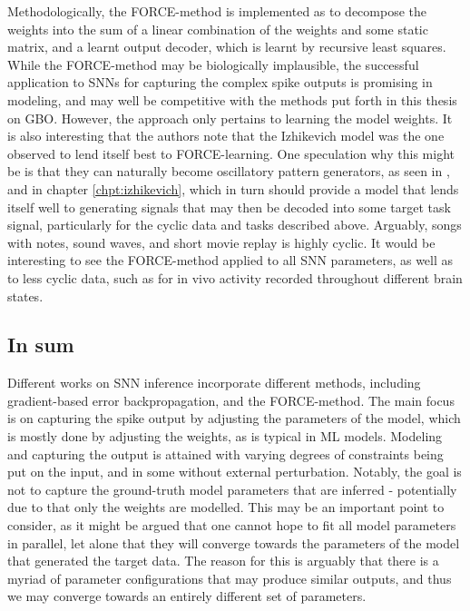 \documentclass[mphil,deptreport,ianc]{infthesis} %
\begin{document}
Methodologically, the FORCE-method is implemented as to decompose the weights into the sum of a linear combination of the weights and some static matrix, and a learnt output decoder, which is learnt by recursive least squares.
While the FORCE-method may be biologically implausible, the successful application to SNNs for capturing the complex spike outputs is promising in modeling, and may well be competitive with the methods put forth in this thesis on GBO.
However, the approach only pertains to learning the model weights.
It is also interesting that the authors note that the Izhikevich model was the one observed to lend itself best to FORCE-learning.
One speculation why this might be is that they can naturally become oscillatory pattern generators, as seen in \cite{Oliveira2019}, and in chapter \ref{chpt:izhikevich}, which in turn should provide a model that lends itself well to generating signals that may then be decoded into some target task signal, particularly for the cyclic data and tasks described above. Arguably, songs with notes, sound waves, and short movie replay is highly cyclic.
It would be interesting to see the FORCE-method applied to all SNN parameters, as well as to less cyclic data, such as for in vivo activity recorded throughout different brain states.

\subsection{In sum}

Different works on SNN inference incorporate different methods, including gradient-based error backpropagation, and the FORCE-method. 
The main focus is on capturing the spike output by adjusting the parameters of the model, which is mostly done by adjusting the weights, as is typical in ML models.
Modeling and capturing the output is attained with varying degrees of constraints being put on the input, and in some without external perturbation.
Notably, the goal is not to capture the ground-truth model parameters that are inferred - potentially due to that only the weights are modelled.
This may be an important point to consider, as it might be argued that one cannot hope to fit all model parameters in parallel, let alone that they will converge towards the parameters of the model that generated the target data. The reason for this is arguably that there is a myriad of parameter configurations that may produce similar outputs, and thus we may converge towards an entirely different set of parameters.
\end{document}

